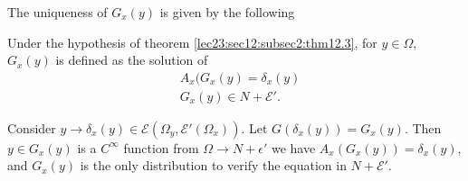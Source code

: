 The uniqueness of $G_x(y)$ is given by the following
\begin{theorem}\label{lec23:sec12:subsec2:thm12.5}%
  Under the hypothesis of theorem \ref{lec23:sec12:subsec2:thm12.3}, for $y \in \Omega$,
  $G_x (y)$ is defined as the solution of  
  \begin{align*}
    & A_x (G_x(y) = \delta_x (y)\\
    & G_x (y) \in N + \mathscr{E}'.
  \end{align*}
\end{theorem}

Consider $y \to \delta_x (y) \in \mathscr{E} (\Omega_y,
\mathscr{E'} (\Omega_x))$. Let $G(\delta_x(y)) = G_x (y)$. Then $y \in 
G_x(y)$ is a $C^\infty$ function from $\Omega \to N + \epsilon'$ we have $A_x (G_x(y)) = \delta_x(y)$, and $G_x(y)$ is the only distribution to verify the
equation in $N + \mathscr{E'}$. 
